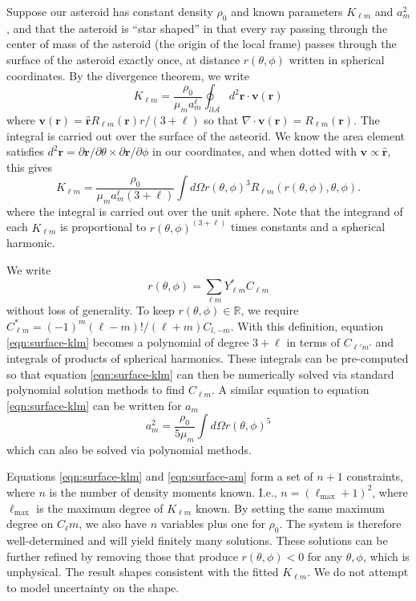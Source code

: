 \documentclass[fleqn,usenatbib]{mnras}
\newcommand{\unit}[1]{\bm{\hat{#1}}}
\begin{document}
Suppose our asteroid has constant density $\rho_0$ and known parameters $K_{\ell m}$ and $a_m^2$, and that the asteroid is ``star shaped'' in that every ray passing through the center of mass of the asteroid (the origin of the local frame) passes through the surface of the asteroid exactly once, at distance $r(\theta, \phi)$ written in spherical coordinates. By the divergence theorem, we write
\begin{equation}
  K_{\ell m} = \frac{\rho_0}{\mu_m a_m^\ell} \oint_{\partial \mathcal{A}} d^2 \bm r \cdot \bm v (\bm r)
\end{equation}
where $\bm v (\bm r) = \unit r R_{\ell m} (\bm r) r / (3+\ell) $ so that $\nabla \cdot \bm v(\bm r) = R_{\ell m}(\bm r)$. The integral is carried out over the surface of the asteorid. We know the area element satisfies $d^2 \bm r = \partial \bm r / \partial \theta \times \partial \bm r / \partial \phi$ in our coordinates, and when dotted with $\bm v \propto \unit r$, this gives
\begin{equation}
  K_{\ell m} = \frac{\rho_0 }{\mu_m a_m^\ell (3 + \ell)} \int d\Omega r(\theta, \phi)^3 R_{\ell m}(r(\theta, \phi), \theta, \phi).
  \label{eqn:surface-klm}
\end{equation}
where the integral is carried out over the unit sphere. Note that the integrand of each $K_{\ell m}$ is proportional to $r(\theta, \phi)^{(3+\ell)}$ times constants and a spherical harmonic.

We write 
\begin{equation}
  r(\theta, \phi) = \sum_{\ell m} Y_{\ell m}^* C_{\ell m}
\end{equation}
without loss of generality. To keep $r(\theta, \phi) \in \mathds{R}$, we require $C_{\ell m}^* = (-1)^m (\ell-m)!/(\ell+m) C_{l,-m}$. With this definition, equation \ref{eqn:surface-klm} becomes a polynomial of degree $3+\ell$ in terms of $C_{\ell' m'}$ and integrals of products of spherical harmonics. These integrals can be pre-computed so that equation \ref{eqn:surface-klm} can then be numerically solved via standard polynomial solution methods to find $C_{\ell m}$. A similar equation to equation \ref{eqn:surface-klm} can be written for $a_m$
\begin{equation}
  a_m^2 = \frac{\rho_0}{5\mu_m}\int d\Omega r(\theta, \phi)^5
  \label{eqn:surface-am}
\end{equation}
which can also be solved via polynomial methods.

Equations \ref{eqn:surface-klm} and \ref{eqn:surface-am} form a set of $n+1$ constraints, where $n$ is the number of density moments known. I.e., $n=(\ell_\text{max}+1)^2$, where $\ell_\text{max}$ is the maximum degree of $K_{\ell m}$ known. By setting the same maximum degree on $C_\ell m$, we also have $n$ variables plus one for $\rho_0$. The system is therefore well-determined and will yield finitely many solutions. These solutions can be further refined by removing those that produce $r(\theta, \phi) < 0$ for any $\theta, \phi$, which is unphysical. The result shapes consistent with the fitted $K_{\ell m}$. We do not attempt to model uncertainty on the shape.
\end{document}
